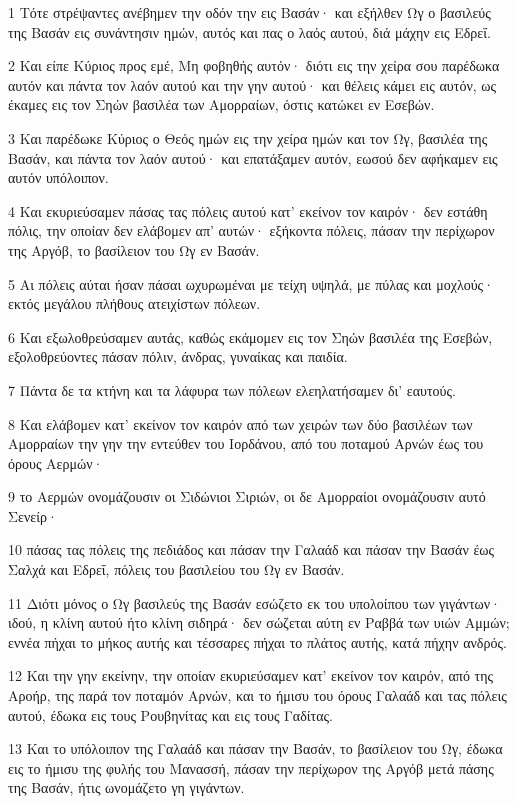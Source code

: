 \par 1 Τότε στρέψαντες ανέβημεν την οδόν την εις Βασάν· και εξήλθεν Ωγ ο βασιλεύς της Βασάν εις συνάντησιν ημών, αυτός και πας ο λαός αυτού, διά μάχην εις Εδρεΐ.
\par 2 Και είπε Κύριος προς εμέ, Μη φοβηθής αυτόν· διότι εις την χείρα σου παρέδωκα αυτόν και πάντα τον λαόν αυτού και την γην αυτού· και θέλεις κάμει εις αυτόν, ως έκαμες εις τον Σηών βασιλέα των Αμορραίων, όστις κατώκει εν Εσεβών.
\par 3 Και παρέδωκε Κύριος ο Θεός ημών εις την χείρα ημών και τον Ωγ, βασιλέα της Βασάν, και πάντα τον λαόν αυτού· και επατάξαμεν αυτόν, εωσού δεν αφήκαμεν εις αυτόν υπόλοιπον.
\par 4 Και εκυριεύσαμεν πάσας τας πόλεις αυτού κατ' εκείνον τον καιρόν· δεν εστάθη πόλις, την οποίαν δεν ελάβομεν απ' αυτών· εξήκοντα πόλεις, πάσαν την περίχωρον της Αργόβ, το βασίλειον του Ωγ εν Βασάν.
\par 5 Αι πόλεις αύται ήσαν πάσαι ωχυρωμέναι με τείχη υψηλά, με πύλας και μοχλούς· εκτός μεγάλου πλήθους ατειχίστων πόλεων.
\par 6 Και εξωλοθρεύσαμεν αυτάς, καθώς εκάμομεν εις τον Σηών βασιλέα της Εσεβών, εξολοθρεύοντες πάσαν πόλιν, άνδρας, γυναίκας και παιδία.
\par 7 Πάντα δε τα κτήνη και τα λάφυρα των πόλεων ελεηλατήσαμεν δι' εαυτούς.
\par 8 Και ελάβομεν κατ' εκείνον τον καιρόν από των χειρών των δύο βασιλέων των Αμορραίων την γην την εντεύθεν του Ιορδάνου, από του ποταμού Αρνών έως του όρους Αερμών·
\par 9 το Αερμών ονομάζουσιν οι Σιδώνιοι Σιριών, οι δε Αμορραίοι ονομάζουσιν αυτό Σενείρ·
\par 10 πάσας τας πόλεις της πεδιάδος και πάσαν την Γαλαάδ και πάσαν την Βασάν έως Σαλχά και Εδρεΐ, πόλεις του βασιλείου του Ωγ εν Βασάν.
\par 11 Διότι μόνος ο Ωγ βασιλεύς της Βασάν εσώζετο εκ του υπολοίπου των γιγάντων· ιδού, η κλίνη αυτού ήτο κλίνη σιδηρά· δεν σώζεται αύτη εν Ραββά των υιών Αμμών; εννέα πήχαι το μήκος αυτής και τέσσαρες πήχαι το πλάτος αυτής, κατά πήχην ανδρός.
\par 12 Και την γην εκείνην, την οποίαν εκυριεύσαμεν κατ' εκείνον τον καιρόν, από της Αροήρ, της παρά τον ποταμόν Αρνών, και το ήμισυ του όρους Γαλαάδ και τας πόλεις αυτού, έδωκα εις τους Ρουβηνίτας και εις τους Γαδίτας.
\par 13 Και το υπόλοιπον της Γαλαάδ και πάσαν την Βασάν, το βασίλειον του Ωγ, έδωκα εις το ήμισυ της φυλής του Μανασσή, πάσαν την περίχωρον της Αργόβ μετά πάσης της Βασάν, ήτις ωνομάζετο γη γιγάντων.
